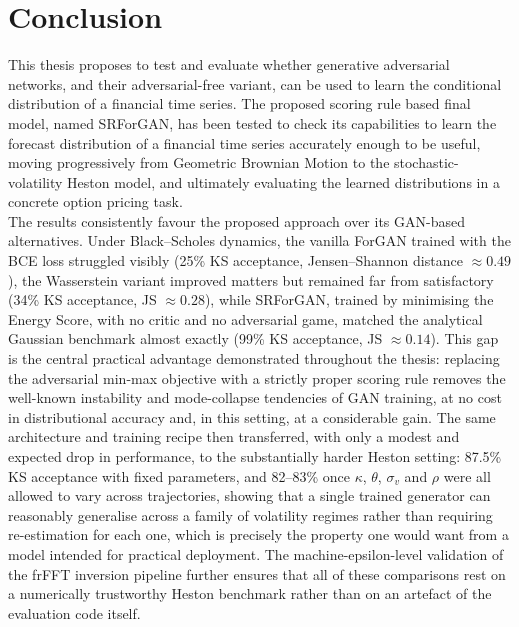 \chapter{Conclusion}

This thesis proposes to test and evaluate whether generative adversarial networks,
and their adversarial-free variant, can be used to learn the conditional distribution of a financial time series.
The proposed scoring rule based final model, named SRForGAN, has been tested to check its capabilities to learn the
forecast distribution of a financial time series accurately enough to be
useful, moving progressively from Geometric Brownian Motion to the
stochastic-volatility Heston model, and ultimately evaluating the learned
distributions in a concrete option pricing task.\\

The results consistently favour the proposed approach over its
GAN-based alternatives. Under Black--Scholes dynamics, the vanilla ForGAN
trained with the BCE loss struggled visibly (25\% KS acceptance,
Jensen--Shannon distance $\approx0.49$), the Wasserstein variant improved
matters but remained far from satisfactory (34\% KS acceptance,
JS $\approx0.28$), while SRForGAN, trained by minimising the Energy
Score, with no critic and no adversarial game, matched the analytical
Gaussian benchmark almost exactly (99\% KS acceptance, JS $\approx0.14$).
This gap is the central practical advantage demonstrated throughout the
thesis: replacing the adversarial min-max objective with a strictly proper
scoring rule removes the well-known instability and mode-collapse
tendencies of GAN training, at no cost in distributional accuracy and, in
this setting, at a considerable gain. The same architecture and training
recipe then transferred, with only a modest and expected drop in
performance, to the substantially harder Heston setting: 87.5\% KS
acceptance with fixed parameters, and 82--83\% once $\kappa$, $\theta$,
$\sigma_v$ and $\rho$ were all allowed to vary across trajectories, showing
that a single trained generator can reasonably generalise across a family
of volatility regimes rather than requiring re-estimation for each one,
which is precisely the property one would want from a model intended for
practical deployment. The machine-epsilon-level validation of the frFFT
inversion pipeline further ensures that all of these comparisons rest on a
numerically trustworthy Heston benchmark rather than on an artefact of the
evaluation code itself.

